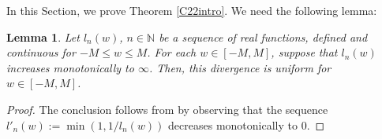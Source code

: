 \documentclass[11pt]{amsart}
\newtheorem{lemma}{Lemma}[section]
\theoremstyle{definition}
\newtheorem*{remark}{Remark}
\newcommand{\N}{{\mathbb N}}
\newcommand{\FM}[1]{{\color{violet}{{#1}}}}
\newcommand{\WS}[1]{{\color{blue}{{#1}}}}
\begin{document}
\fi

In this Section, we prove Theorem \ref{C22intro}.
We need the following lemma:
\begin{lemma}\label{uniformityeliott}
Let $l_n(w)$, $n \in \N$ be a sequence of real functions, defined and continuous for $-M \leq w \leq M$. For each $w \in [-M,M]$, suppose that $l_n(w)$ increases monotonically to $\infty$. Then, this divergence is uniform for  $w\in [-M,M]$. 
\end{lemma}
\begin{proof}
  The conclusion follows from \cite[Lemma~6.7]{E79book} by observing that the sequence $l'_{n}(w):=\min(1, 1/l_n(w))$ decreases monotonically to 0.
\end{proof}
 
\end{document}
